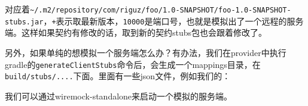 \documentclass[12pt]{article}
\begin{document}
对应着\texttt{\textasciitilde{}/.m2/repository/com/riguz/foo/1.0-SNAPSHOT/foo-1.0-SNAPSHOT-stubs.jar}，\texttt{+}表示取最新版本，\texttt{10000}是端口号，也就是模拟出了一个远程的服务端。这样如果契约有修改的话，取到新的契约stubs包也会跟着修改了。

另外，如果单纯的想模拟一个服务端怎么办？有办法，我们在provider中执行gradle的\texttt{generateClientStubs}命令后，会生成一个mappings目录，在\texttt{build/stubs/....}下面。里面有一些json文件，例如我们的：

\begin{Shaded}
\begin{Highlighting}[]
\FunctionTok{\{}
   \FunctionTok{:} \FunctionTok{,}
   \FunctionTok{:} \FunctionTok{\{}
     \FunctionTok{:} \FunctionTok{,}
     \FunctionTok{:} 
  \FunctionTok{\},}
   \FunctionTok{:} \FunctionTok{\{}
     \FunctionTok{:} \FunctionTok{,}
     \FunctionTok{:} \StringTok{:}\StringTok{,}\StringTok{:}\StringTok{,}\StringTok{:}\CharTok{\textbackslash{}\textbackslash{}}\StringTok{,}\FunctionTok{,}
     \FunctionTok{:} \FunctionTok{\{}
       \FunctionTok{:} 
    \FunctionTok{\},}
     \FunctionTok{:} \OtherTok{[}  \OtherTok{]}
  \FunctionTok{\},}
   \FunctionTok{:} 
\FunctionTok{\}}
\end{Highlighting}
\end{Shaded}

我们可以通过wiremock-standalone来启动一个模拟的服务端。
\end{document}
